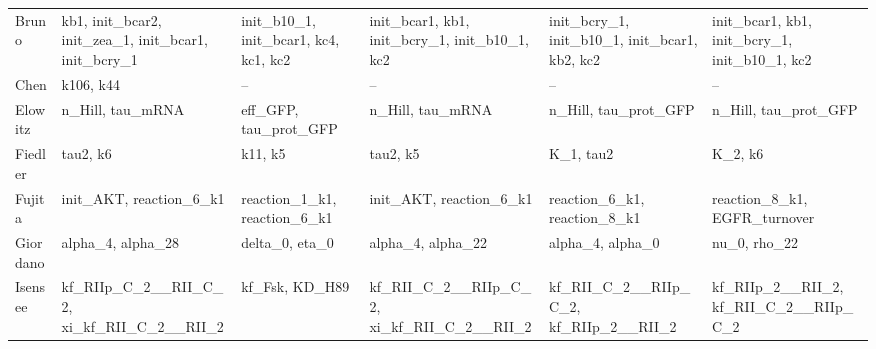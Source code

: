 \begin{longtable}{@{}l>{\raggedright}p{2.6cm}>{\raggedright}p{2.6cm}>{\raggedright}p{2.6cm}>{\raggedright}p{2.6cm}>{\raggedright\arraybackslash}p{2.6cm}@{}}
Bruno & kb1, init\_\allowbreak{}bcar2, init\_\allowbreak{}zea\_\allowbreak{}1, init\_\allowbreak{}bcar1, init\_\allowbreak{}bcry\_\allowbreak{}1 & init\_\allowbreak{}b10\_\allowbreak{}1, init\_\allowbreak{}bcar1, kc4, kc1, kc2 & init\_\allowbreak{}bcar1, kb1, init\_\allowbreak{}bcry\_\allowbreak{}1, init\_\allowbreak{}b10\_\allowbreak{}1, kc2 & init\_\allowbreak{}bcry\_\allowbreak{}1, init\_\allowbreak{}b10\_\allowbreak{}1, init\_\allowbreak{}bcar1, kb2, kc2 & init\_\allowbreak{}bcar1, kb1, init\_\allowbreak{}bcry\_\allowbreak{}1, init\_\allowbreak{}b10\_\allowbreak{}1, kc2 \\
Chen & k106, k44 & -- & -- & -- & -- \\
Elowitz & n\_\allowbreak{}Hill, tau\_\allowbreak{}mRNA & eff\_\allowbreak{}GFP, tau\_\allowbreak{}prot\_\allowbreak{}GFP & n\_\allowbreak{}Hill, tau\_\allowbreak{}mRNA & n\_\allowbreak{}Hill, tau\_\allowbreak{}prot\_\allowbreak{}GFP & n\_\allowbreak{}Hill, tau\_\allowbreak{}prot\_\allowbreak{}GFP \\
Fiedler & tau2, k6 & k11, k5 & tau2, k5 & K\_\allowbreak{}1, tau2 & K\_\allowbreak{}2, k6 \\
Fujita & init\_\allowbreak{}AKT, reaction\_\allowbreak{}6\_\allowbreak{}k1 & reaction\_\allowbreak{}1\_\allowbreak{}k1, reaction\_\allowbreak{}6\_\allowbreak{}k1 & init\_\allowbreak{}AKT, reaction\_\allowbreak{}6\_\allowbreak{}k1 & reaction\_\allowbreak{}6\_\allowbreak{}k1, reaction\_\allowbreak{}8\_\allowbreak{}k1 & reaction\_\allowbreak{}8\_\allowbreak{}k1, EGFR\_\allowbreak{}turnover \\
Giordano & alpha\_\allowbreak{}4, alpha\_\allowbreak{}28 & delta\_\allowbreak{}0, eta\_\allowbreak{}0 & alpha\_\allowbreak{}4, alpha\_\allowbreak{}22 & alpha\_\allowbreak{}4, alpha\_\allowbreak{}0 & nu\_\allowbreak{}0, rho\_\allowbreak{}22 \\
Isensee & kf\_\allowbreak{}RIIp\_\allowbreak{}C\_\allowbreak{}2\_\allowbreak{}\_\allowbreak{}RII\_\allowbreak{}C\_\allowbreak{}2, xi\_\allowbreak{}kf\_\allowbreak{}RII\_\allowbreak{}C\_\allowbreak{}2\_\allowbreak{}\_\allowbreak{}RII\_\allowbreak{}2 & kf\_\allowbreak{}Fsk, KD\_\allowbreak{}H89 & kf\_\allowbreak{}RII\_\allowbreak{}C\_\allowbreak{}2\_\allowbreak{}\_\allowbreak{}RIIp\_\allowbreak{}C\_\allowbreak{}2, xi\_\allowbreak{}kf\_\allowbreak{}RII\_\allowbreak{}C\_\allowbreak{}2\_\allowbreak{}\_\allowbreak{}RII\_\allowbreak{}2 & kf\_\allowbreak{}RII\_\allowbreak{}C\_\allowbreak{}2\_\allowbreak{}\_\allowbreak{}RIIp\_\allowbreak{}C\_\allowbreak{}2, kf\_\allowbreak{}RIIp\_\allowbreak{}2\_\allowbreak{}\_\allowbreak{}RII\_\allowbreak{}2 & kf\_\allowbreak{}RIIp\_\allowbreak{}2\_\allowbreak{}\_\allowbreak{}RII\_\allowbreak{}2, kf\_\allowbreak{}RII\_\allowbreak{}C\_\allowbreak{}2\_\allowbreak{}\_\allowbreak{}RIIp\_\allowbreak{}C\_\allowbreak{}2 \\

\end{longtable}
